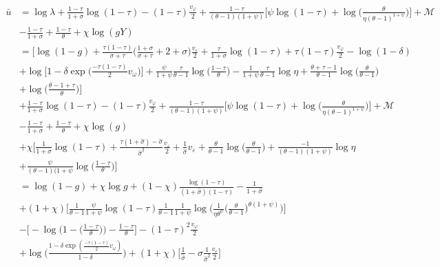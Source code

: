 \documentclass{article}
\newcommand{\M}{\mathcal{M}}
\begin{document}
\begin{itemize}
\begin{align*}
\bar u 
&= \log \lambda + \frac{1-\tau}{1+\sigma} \log (1-\tau)  - (1-\tau) \frac{v_\varphi}{2} + \frac{1-\tau}{(\theta- 1)(1+\psi)} \Bigg[\psi \log(1-\tau) + \log\Bigg(\frac{\theta}{\eta (\theta - 1)^{1+\psi}}\Bigg)\Bigg] + \M \\
&-   \frac{1-\tau}{1+\sigma}+   \frac{1-\tau}{\theta} + \chi \log (gY) \\
&= \Bigg[\log (1-g) + \frac{\tau(1-\tau)}{\sigma + \tau} \Big( \frac{1+\sigma}{\sigma + \tau} + 2 + \sigma \Big)\frac{v_\varepsilon}{2} + \frac{\tau}{1+\sigma} \log(1-\tau) + \tau(1-\tau)\frac{v_\varphi}{2} - \log(1-\delta) \\
&+ \log \Big[ 1 - \delta \exp\Big( \frac{-\tau(1-\tau)}{2}v_\omega \Big) \Big] + \frac{\psi}{1+\psi}\frac{\tau}{\theta-1}\log \Big( \frac{1-\tau}{\theta}\Big) - \frac{1}{1+\psi}\frac{\tau}{\theta-1} \log \eta + \frac{\theta + \tau - 1}{\theta - 1} \log \Big( \frac{\theta}{\theta - 1} \Big) \\
&+ \log \Big( \frac{\theta - 1 + \tau}{\theta} \Big)\Bigg]\\
&+ \frac{1-\tau}{1+\sigma} \log (1-\tau)  - (1-\tau) \frac{v_\varphi}{2} + \frac{1-\tau}{(\theta- 1)(1+\psi)} \Bigg[\psi \log(1-\tau) + \log\Bigg(\frac{\theta}{\eta (\theta - 1)^{1+\psi}}\Bigg)\Bigg] + \M \\
&-   \frac{1-\tau}{1+\sigma}+   \frac{1-\tau}{\theta} + \chi \log (g)\\
&+ \chi \Bigg[ \frac{1}{1+\sigma} \log (1-\tau) + \frac{\tau(1+\hat\sigma) - \hat \sigma}{\hat \sigma^2}\frac{v_\varepsilon}{2} + \frac{1}{\hat\sigma} v_\varepsilon + \frac{\theta}{\theta-1}\log\Big( \frac{\theta}{\theta-1} \Big) + \frac{-1}{(\theta-1)(1+\psi)} \log \eta\\ &+ \frac{\psi}{(\theta-1)(1+\psi} \log \Big( \frac{1-\tau}{\theta} \Big)\Bigg]\\
&= \log (1-g) + \chi \log g + (1-\chi) \frac{\log(1-\tau)}{(1+\hat \sigma)(1-\tau)} - \frac{1}{1+\hat \sigma}\\
&+ (1+\chi)\Bigg[ \frac{1}{\theta - 1}\frac{\psi}{1+\psi} \log(1-\tau) \frac{1}{\theta - 1}\frac{1}{1+\psi} \log \Bigg( \frac{1}{\eta \theta^\psi} \Big( \frac{\theta}{\theta - 1} \Big)^{\theta(1+\psi)} \Bigg) \Bigg]\\
&- \Bigg[ -\log\Bigg( 1- \Bigg( \frac{1-\tau}{\theta} \Bigg)  \Bigg) - \frac{1-\tau}{\theta}\Bigg] - (1-\tau)^2\frac{v_\varphi}{2}\\
&+ \log \Bigg( \frac{1-\delta \exp( \frac{-\tau(1-\tau)}{2} v_\omega)}{1-\delta} \Bigg) + (1+\chi) \Bigg[\frac{1}{\hat\sigma} - \sigma \frac{1}{\hat\sigma^2}\frac{v_\varepsilon}{2}\Bigg]

\end{align*}
\end{itemize}
\end{document}
